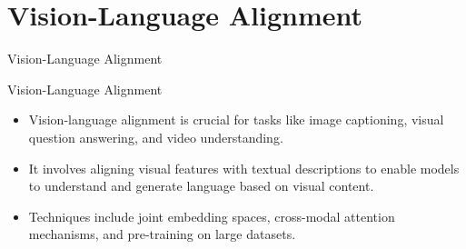 \section{Vision-Language Alignment}
\begin{frame}{}
    \LARGE Vision-Language Alignment
\end{frame}

\begin{frame}{Vision-Language Alignment}
    \begin{itemize}
        \item Vision-language alignment is crucial for tasks like image captioning, visual question answering, and video understanding.
        \item It involves aligning visual features with textual descriptions to enable models to understand and generate language based on visual content.
        \item Techniques include joint embedding spaces, cross-modal attention mechanisms, and pre-training on large datasets.
    \end{itemize}
\end{frame}

